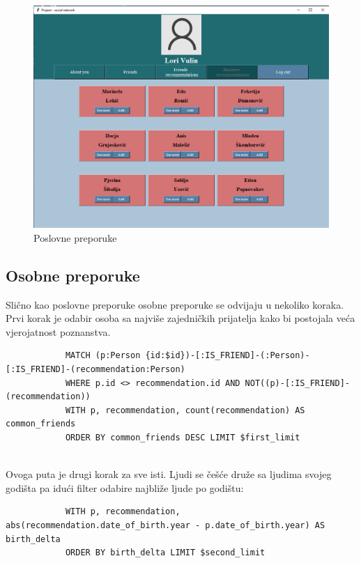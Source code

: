 \documentclass[titlepage, 12pt]{scrartcl}
\begin{document}
	\begin{figure}[h]
		\centering
		\includegraphics[scale = 0.55]{slike/business.jpg}
		\caption{Poslovne preporuke}
		\label{fig:business_rec}
	\end{figure}
	
	\subsection{Osobne preporuke}
	Slično kao poslovne preporuke osobne preporuke se odvijaju u nekoliko koraka. \\
	Prvi korak je odabir osoba sa najviše zajedničkih prijatelja kako bi postojala veća vjerojatnost poznanstva.
	\begin{samepage}
		\begin{verbatim}
			MATCH (p:Person {id:$id})-[:IS_FRIEND]-(:Person)-[:IS_FRIEND]-(recommendation:Person)
			WHERE p.id <> recommendation.id AND NOT((p)-[:IS_FRIEND]-(recommendation))
			WITH p, recommendation, count(recommendation) AS common_friends
			ORDER BY common_friends DESC LIMIT $first_limit
			
		\end{verbatim}
	\end{samepage}
	Ovoga puta je drugi korak za sve isti. Ljudi se češće druže sa ljudima svojeg godišta pa idući filter odabire najbliže ljude po godištu:
	\begin{samepage}
		\begin{verbatim}
			WITH p, recommendation, abs(recommendation.date_of_birth.year - p.date_of_birth.year) AS birth_delta 
			ORDER BY birth_delta LIMIT $second_limit
			
		\end{verbatim}
	\end{samepage}
	
\end{document}

